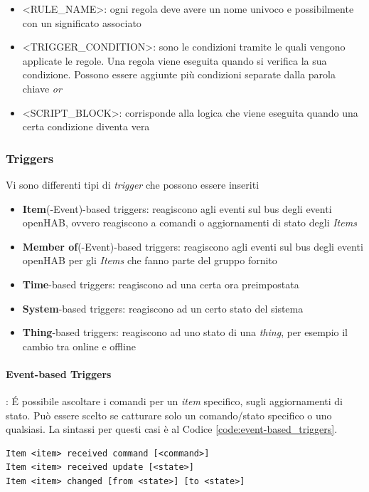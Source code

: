 \begin{itemize}
    \item \textless RULE\_NAME\textgreater: ogni regola deve avere un nome univoco e possibilmente con un significato associato
    \item \textless TRIGGER\_CONDITION\textgreater: sono le condizioni tramite le quali vengono applicate le regole. Una regola viene eseguita quando si verifica la sua condizione. Possono essere aggiunte più condizioni separate dalla parola chiave {\em or}
    \item \textless SCRIPT\_BLOCK\textgreater: corrisponde alla logica che viene eseguita quando una certa condizione diventa vera
\end{itemize}

\subsubsection{Triggers}
Vi sono differenti tipi di {\em trigger} che possono essere inseriti
\begin{itemize}
    \item \textbf{Item}(-Event)-based triggers: reagiscono agli eventi sul bus degli eventi openHAB, ovvero reagiscono a comandi o aggiornamenti di stato degli {\em Items}
    \item \textbf{Member of}(-Event)-based triggers: reagiscono agli eventi sul bus degli eventi openHAB per gli {\em Items} che fanno parte del gruppo fornito
    \item \textbf{Time}-based triggers: reagiscono ad una certa ora preimpostata
    \item \textbf{System}-based triggers: reagiscono ad un certo stato del sistema
    \item \textbf{Thing}-based triggers: reagiscono ad uno stato di una {\em thing}, per esempio il cambio tra online e offline
\end{itemize}

\paragraph{Event-based Triggers}: \'E possibile ascoltare i comandi per un {\em item} specifico, sugli aggiornamenti di stato. Può essere scelto se catturare solo un comando/stato specifico o uno qualsiasi. La sintassi per questi casi è al Codice \ref{code:event-based_triggers}.

\begin{lstlisting}[caption=Event-based Triggers,label=code:event-based_triggers]
Item <item> received command [<command>]
Item <item> received update [<state>]
Item <item> changed [from <state>] [to <state>]
\end{lstlisting}

